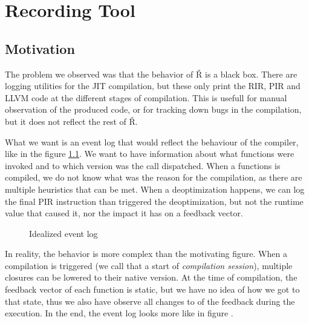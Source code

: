 \chapter{Recording Tool}

\begin{chapterabstract}
	\todoadd
\end{chapterabstract}

\section{Motivation}

The problem we observed was that the behavior of Ř is a black box. There are logging utilities for the JIT compilation, but these only print the RIR, PIR and LLVM code at the different stages of compilation. This is usefull for manual observation of the produced code, or for tracking down bugs in the compilation, but it does not reflect the rest of Ř.

What we want is an event log that would reflect the behaviour of the compiler, like in the figure \ref{fig:motivation-events}. We want to have information about what functions were invoked and to which version was the call dispatched. When a functions is compiled, we do not know what was the reason for the compilation, as there are multiple heuristics that can be met. When a deoptimization happens, we can log the final PIR instruction than triggered the deoptimization, but not the runtime value that caused it, nor the impact it has on a feedback vector.

\begin{figure}[H]
	\centering
	\begin{adjustwidth}{-3cm}{-3cm}
	\end{adjustwidth}
	\caption{Idealized event log}\label{fig:motivation-events}
\end{figure}


In reality, the behavior is more complex than the motivating figure. When a compilation is triggered (we call that a start of \textit{compilation session}), multiple closures can be lowered to their native version. At the time of compilation, the feedback vector of each function is static, but we have no idea of how we got to that state, thus we also have observe all changes to of the feedback during the execution. In the end, the event log looks more like in figure \todoadd.

